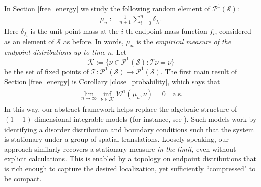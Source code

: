 \documentclass[11pt,reqno]{amsart}
\numberwithin{equation}{section}
\theoremstyle{definition}
\begin{document}
In Section \ref{free_energy} we study the following random element of ${\mathcal{P}}^1({\mathcal{S}})$:
{\begin{align*} {
\mu_n := \frac{1}{n+1}\sum_{i = 0}^n \delta_{f_i}.
} \end{align*}}
Here $\delta_{f_i}$ is the unit point mass at the $i$-th endpoint mass function $f_i$, considered as an element of ${\mathcal{S}}$ as before. In words, $\mu_n$ is the \textit{empirical measure of the endpoint distributions up to time $n$}. Let 
\[
{\mathcal{K}} := \{\nu \in {\mathcal{P}}^1({\mathcal{S}}) : {\mathcal{T}}\nu = \nu\}
\]
be the set of fixed points of ${\mathcal{T}} : {\mathcal{P}}^1({\mathcal{S}}) \to {\mathcal{P}}^1({\mathcal{S}})$.
The first main result of Section \ref{free_energy} is Corollary \ref{close_probability}, which says that
{\begin{align} \begin{split} {
\lim_{n \to \infty} \inf_{\nu \in {\mathcal{K}}} {\mathcal{W}}^1(\mu_n,\nu) = 0 \quad \mathrm{a.s.} \label{going_to_K}
} \end{split} \end{align}}
In this way, our abstract framework helps replace the algebraic structure of $(1+1)$-dimensional integrable models (for instance, see \cite{seppalainen12,corwin-seppalainen-shen15,barraquand-corwin15,thiery-doussal15}).
Such models work by identifying a disorder distribution and boundary conditions such that the system is stationary under a group of spatial translations.
Loosely speaking, our approach similarly recovers a stationary measure \textit{in the limit}, even without explicit calculations.
This is enabled by a topology on endpoint distributions that is rich enough to capture the desired localization, yet sufficiently ``compressed" to be compact.
\end{document}
